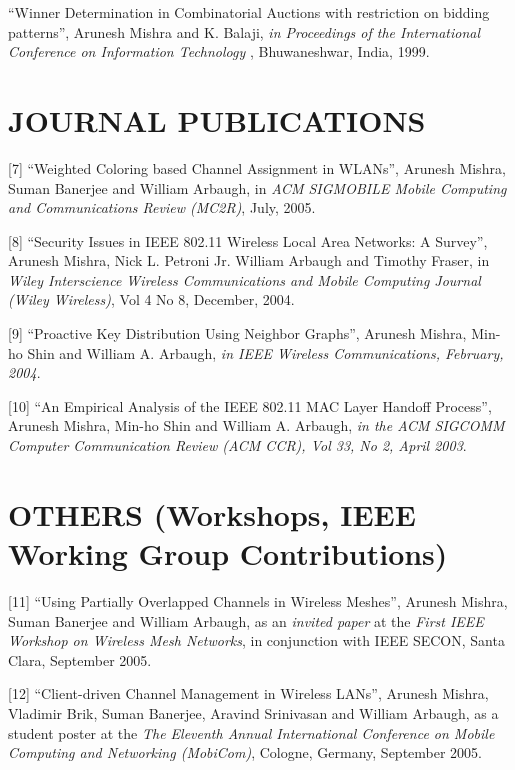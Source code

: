 \begin{resume}
[6] ``Winner Determination in Combinatorial Auctions with restriction on bidding patterns'', Arunesh Mishra and
K. Balaji, {\em in Proceedings of the International Conference on Information Technology }, Bhuwaneshwar, India, 1999.

\section{JOURNAL PUBLICATIONS}
\vspace{0.5cm}

[7] ``Weighted Coloring based Channel Assignment in WLANs'', Arunesh Mishra, Suman Banerjee and William Arbaugh,
in {\em ACM SIGMOBILE Mobile Computing and Communications Review (MC2R)}, July, 2005.


[8] ``Security Issues in IEEE 802.11 Wireless Local Area Networks: A Survey'', Arunesh Mishra, Nick L. Petroni Jr. William Arbaugh and Timothy Fraser, 
in {\em  Wiley Interscience Wireless Communications and Mobile Computing Journal (Wiley Wireless)}, Vol 4 No 8, December, 2004.

[9] ``Proactive Key Distribution Using Neighbor Graphs'', Arunesh Mishra,  Min-ho Shin and William A. Arbaugh,
{\em in IEEE Wireless Communications, February, 2004}. 

[10] ``An Empirical Analysis of the IEEE 802.11 MAC Layer Handoff Process'', Arunesh Mishra,  
Min-ho Shin and William A. Arbaugh, {\em in the ACM SIGCOMM Computer Communication Review (ACM CCR),
Vol 33, No 2, April 2003}. 



\section{OTHERS (Workshops, IEEE Working Group Contributions)}

\vspace{0.5cm}

[11] ``Using Partially Overlapped Channels in Wireless Meshes'', Arunesh Mishra, Suman Banerjee and William Arbaugh,
as an {\em invited paper} at the {\em First IEEE Workshop on Wireless Mesh Networks}, in conjunction with IEEE SECON,
Santa Clara, September 2005.

[12] ``Client-driven Channel Management in Wireless LANs'', Arunesh Mishra, Vladimir Brik, Suman Banerjee, Aravind Srinivasan
and William Arbaugh, as a student poster at  the {\em The Eleventh Annual International Conference on Mobile Computing and Networking (MobiCom)},
Cologne, Germany, September 2005.


\end{resume}
